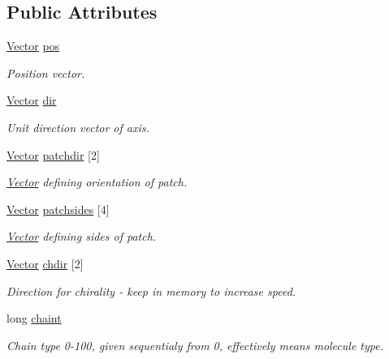 \subsection*{Public Attributes}
\begin{DoxyCompactItemize}
\item 
\hyperlink{class_vector}{Vector} \hyperlink{class_particle_a257abdde975b38a8c6f5be812f18443f}{pos}
\begin{DoxyCompactList}\small\item\em Position vector. \end{DoxyCompactList}\item 
\hyperlink{class_vector}{Vector} \hyperlink{class_particle_a6c8d0f728a634e7ec018fa25e8d59fc6}{dir}
\begin{DoxyCompactList}\small\item\em Unit direction vector of axis. \end{DoxyCompactList}\item 
\hyperlink{class_vector}{Vector} \hyperlink{class_particle_a079cbdc927c2390bfbf1aeed90bb94e6}{patchdir} \mbox{[}2\mbox{]}
\begin{DoxyCompactList}\small\item\em \hyperlink{class_vector}{Vector} defining orientation of patch. \end{DoxyCompactList}\item 
\hyperlink{class_vector}{Vector} \hyperlink{class_particle_a2c60d94c5664a2af5232373f08d74065}{patchsides} \mbox{[}4\mbox{]}
\begin{DoxyCompactList}\small\item\em \hyperlink{class_vector}{Vector} defining sides of patch. \end{DoxyCompactList}\item 
\hyperlink{class_vector}{Vector} \hyperlink{class_particle_adb1225ad15e081be7534279d63bcdf94}{chdir} \mbox{[}2\mbox{]}
\begin{DoxyCompactList}\small\item\em Direction for chirality -\/ keep in memory to increase speed. \end{DoxyCompactList}\item 
long \hyperlink{class_particle_a0ca4fb9c64dddcda93acc502767f7432}{chaint}
\begin{DoxyCompactList}\small\item\em Chain type 0-\/100, given sequentialy from 0, effectively means molecule type. \end{DoxyCompactList}\item 

\end{DoxyCompactItemize}
